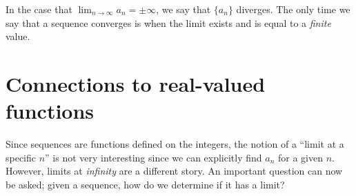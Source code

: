 \documentclass{ximera}
\begin{document}
%
%    
%

\begin{warning}
  In the case that $\lim_{n \to \infty} a_n = \pm\infty$, we say that
  $\{a_n\}$ diverges.  The only time we say that a sequence converges
    is when the limit exists and is equal to a \textit{finite} value.
\end{warning}



\section{Connections to real-valued functions}
Since sequences are functions defined on the integers, the notion of a ``limit at a specific $n$'' is not very interesting since we can explicitly find $a_n$ for a given $n$. However, limits at \textit{infinity} are a different story.  An important question can now be asked; given a sequence, how do we determine if it has a limit?  
\end{document}
